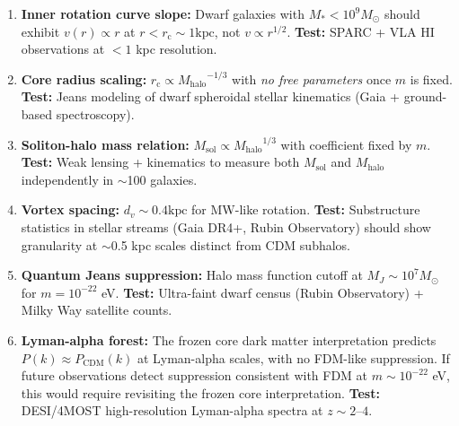\documentclass[11pt,a4paper]{article}
\newcommand{\Msun}{\ensuremath{M_\odot}}
\newcommand{\Msol}{\ensuremath{M_{\mathrm{sol}}}}
\newcommand{\Mhalo}{\ensuremath{M_{\mathrm{halo}}}}
\newcommand{\kpc}{\ensuremath{\mathrm{kpc}}}
\newcommand{\rc}{\ensuremath{r_{\mathrm{c}}}}
\theoremstyle{definition}
\theoremstyle{remark}
\begin{document}
\begin{enumerate}[leftmargin=*, itemsep=0.5em]
\item \textbf{Inner rotation curve slope:} Dwarf galaxies with $M_* < 10^9 \Msun$ should exhibit $v(r) \propto r$ at $r < \rc \sim 1 \kpc$, not $v \propto r^{1/2}$. \textbf{Test:} SPARC + VLA HI observations at $<1$ kpc resolution.

\item \textbf{Core radius scaling:} $\rc \propto \Mhalo^{-1/3}$ with \emph{no free parameters} once $m$ is fixed. \textbf{Test:} Jeans modeling of dwarf spheroidal stellar kinematics (Gaia + ground-based spectroscopy).

\item \textbf{Soliton-halo mass relation:} $\Msol \propto \Mhalo^{1/3}$ with coefficient fixed by $m$. \textbf{Test:} Weak lensing + kinematics to measure both $\Msol$ and $\Mhalo$ independently in $\sim$100 galaxies.

\item \textbf{Vortex spacing:} $d_v \sim 0.4 \kpc$ for MW-like rotation. \textbf{Test:} Substructure statistics in stellar streams (Gaia DR4+, Rubin Observatory) should show granularity at $\sim$0.5 kpc scales distinct from CDM subhalos.

\item \textbf{Quantum Jeans suppression:} Halo mass function cutoff at $M_J \sim 10^7 \Msun$ for $m = 10^{-22}$ eV. \textbf{Test:} Ultra-faint dwarf census (Rubin Observatory) + Milky Way satellite counts.

\item \textbf{Lyman-alpha forest:} The frozen core dark matter interpretation predicts $P(k) \approx P_{\mathrm{CDM}}(k)$ at Lyman-alpha scales, with no FDM-like suppression. If future observations detect suppression consistent with FDM at $m \sim 10^{-22}$ eV, this would require revisiting the frozen core interpretation. \textbf{Test:} DESI/4MOST high-resolution Lyman-alpha spectra at $z \sim 2$--$4$.
\end{enumerate}
\end{document}
